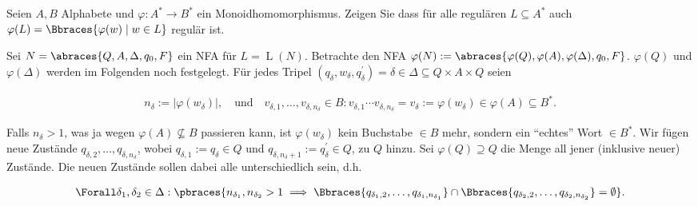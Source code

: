 
\begin{exercise}

Seien $A, B$ Alphabete und $\varphi: A^\ast \to B^\ast$ ein Monoidhomomorphismus.
Zeigen Sie dass für alle regulären $L \subseteq A^\ast$ auch $\varphi(L) = \Bbraces{\varphi(w) \mid w \in L}$ regulär ist.

\end{exercise}


\begin{solution}

Sei $N = \abraces{Q, A, \Delta, q_0, F}$ ein NFA für $L = \operatorname L(N)$.
Betrachte den NFA $\varphi(N) := \abraces{\varphi(Q), \varphi(A), \varphi(\Delta), q_0, F}$.
$\varphi(Q)$ und $\varphi(\Delta)$ werden im Folgenden noch festgelegt.
Für jedes Tripel $(q_\delta, w_\delta, q_\delta^\prime) = \delta \in \Delta \subseteq Q \times A \times Q$ seien

\begin{align*}
    n_\delta := |\varphi(w_\delta)|,
    \quad
    \text{und}
    \quad
    v_{\delta, 1}, \dots, v_{\delta, n_\delta} \in B:
        v_{\delta, 1} \cdots v_{\delta, n_\delta}
        =
        v_\delta
        :=
        \varphi(w_\delta)
        \in
        \varphi(A) \subseteq B^\ast.
\end{align*}

Falls $n_\delta > 1$, was ja wegen $\varphi(A) \not \subseteq B$ passieren kann, ist $\varphi(w_\delta)$ kein Buchstabe $\in B$ mehr, sondern ein \enquote{echtes} Wort $\in B^\ast$.
Wir fügen neue Zustände $q_{\delta, 2}, \dots, q_{\delta, n_{\delta}}$, wobei $q_{\delta, 1} := q_\delta \in Q$ und $q_{\delta, n_\delta + 1} := q_\delta^\prime \in Q$, zu $Q$ hinzu.
Sei $\varphi(Q) \supseteq Q$ die Menge all jener (inklusive neuer) Zustände.
Die neuen Zustände sollen dabei alle unterschiedlich sein, d.h.

\begin{align*}
    \Forall \delta_1, \delta_2 \in \Delta:
        \pbraces
        {
            n_{\delta_1}, n_{\delta_2} > 1
            \implies
            \Bbraces{q_{\delta_1, 2}, \dots, q_{\delta_1, n_{\delta_1}}}
            \cap
            \Bbraces{q_{\delta_2, 2}, \dots, q_{\delta_2, n_{\delta_2}}}
            =
            \emptyset
        }.
\end{align*}


\end{solution}
